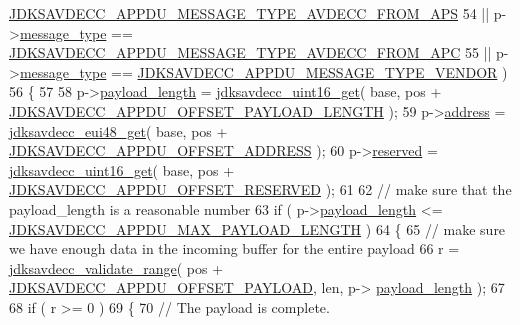 \begin{DoxyCode}
      \hyperlink{group__appdu__constants_gaf8683fad673129f5cfaf7db9470435ba}{JDKSAVDECC\_APPDU\_MESSAGE\_TYPE\_AVDECC\_FROM\_APS}
54                  || p->\hyperlink{structjdksavdecc__appdu_aeaaffeace8c23899e558022f62ce6de4}{message\_type} == 
      \hyperlink{group__appdu__constants_gae1865f8d6a4ab7442673d2f81c5b13ab}{JDKSAVDECC\_APPDU\_MESSAGE\_TYPE\_AVDECC\_FROM\_APC}
55                  || p->\hyperlink{structjdksavdecc__appdu_aeaaffeace8c23899e558022f62ce6de4}{message\_type} == 
      \hyperlink{group__appdu__constants_ga44d11184e6ad9c978d342be41eace3f2}{JDKSAVDECC\_APPDU\_MESSAGE\_TYPE\_VENDOR} )
56             \{
57 
58                 p->\hyperlink{structjdksavdecc__appdu_a35753b38429185bc9a6e6f711925d6f1}{payload\_length} = \hyperlink{group__endian_ga3fbbbc20be954aa61e039872965b0dc9}{jdksavdecc\_uint16\_get}( base, pos + 
      \hyperlink{group__appdu__offset_ga38243b0c214e3270829997effb1aafec}{JDKSAVDECC\_APPDU\_OFFSET\_PAYLOAD\_LENGTH} );
59                 p->\hyperlink{structjdksavdecc__appdu_a58564d10e6bb944368888630d011b003}{address} = \hyperlink{group__eui48_ga7b4c95f03a90bdf416e9d0833ac08a86}{jdksavdecc\_eui48\_get}( base, pos + 
      \hyperlink{group__appdu__offset_ga15be7a53e331d7d83a0e1909abae7ae2}{JDKSAVDECC\_APPDU\_OFFSET\_ADDRESS} );
60                 p->\hyperlink{structjdksavdecc__appdu_a5a6ed8c04a3db86066924b1a1bf4dad3}{reserved} = \hyperlink{group__endian_ga3fbbbc20be954aa61e039872965b0dc9}{jdksavdecc\_uint16\_get}( base, pos + 
      \hyperlink{group__appdu__offset_ga3bfdd1153365a6b7a1b8849f382a950c}{JDKSAVDECC\_APPDU\_OFFSET\_RESERVED} );
61 
62                 \textcolor{comment}{// make sure that the payload\_length is a reasonable number}
63                 \textcolor{keywordflow}{if} ( p->\hyperlink{structjdksavdecc__appdu_a35753b38429185bc9a6e6f711925d6f1}{payload\_length} <= 
      \hyperlink{group__appdu__constants_gad8ac9f39ba96a6faf9e4d69b1530272f}{JDKSAVDECC\_APPDU\_MAX\_PAYLOAD\_LENGTH} )
64                 \{
65                     \textcolor{comment}{// make sure we have enough data in the incoming buffer for the entire payload}
66                     r = \hyperlink{group__util_ga9c02bdfe76c69163647c3196db7a73a1}{jdksavdecc\_validate\_range}( pos + 
      \hyperlink{group__appdu__offset_ga8ac1754da7222c1b936a70a384b3a89d}{JDKSAVDECC\_APPDU\_OFFSET\_PAYLOAD}, len, p->
      \hyperlink{structjdksavdecc__appdu_a35753b38429185bc9a6e6f711925d6f1}{payload\_length} );
67 
68                     \textcolor{keywordflow}{if} ( r >= 0 )
69                     \{
70                         \textcolor{comment}{// The payload is complete.}

\end{DoxyCode}
